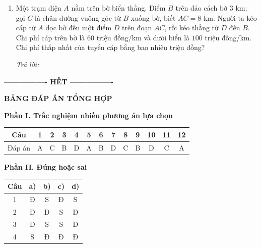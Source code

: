 \documentclass[12pt,a4paper]{article}
\newcommand{\otraloi}{\par\nobreak\smallskip\noindent\textit{Trả lời:}\quad\fbox{\rule{0pt}{11pt}\makebox[0.3cm]{}}\,\fbox{\rule{0pt}{11pt}\makebox[0.3cm]{}}\,\fbox{\rule{0pt}{11pt}\makebox[0.3cm]{}}\,\fbox{\rule{0pt}{11pt}\makebox[0.3cm]{}}}
\begin{document}
\begin{enumerate}[start=3]
\item Một trạm điện $A$ nằm trên bờ biển thẳng. Điểm $B$ trên đảo cách bờ $3$ km;
gọi $C$ là chân đường vuông góc từ $B$ xuống bờ, biết $AC=8$ km.
Người ta kéo cáp từ $A$ dọc bờ đến một điểm $D$ trên đoạn $AC$, rồi kéo thẳng từ $D$ đến $B$.
Chi phí cáp trên bờ là $60$ triệu đồng/km và dưới biển là $100$ triệu đồng/km.
Chi phí thấp nhất của tuyến cáp bằng bao nhiêu triệu đồng?
\begin{center}
\par{}
\end{center}
\otraloi
\end{enumerate}
\begin{center}\textbf{---------------- HẾT ----------------}\end{center}

\newpage\pagestyle{answers}
\begin{center}\Large\textbf{BẢNG ĐÁP ÁN TỔNG HỢP}\end{center}
\textbf{Phần I. Trắc nghiệm nhiều phương án lựa chọn}
\begin{center}
\renewcommand{\arraystretch}{1.5}
\begin{tabular}{|c|*{12}{c|}}\hline
Câu & 1&2&3&4&5&6&7&8&9&10&11&12\\\hline
Đáp án & A & C & B & D & A & B & D & C & B & D & C & A \\\hline
\end{tabular}
\end{center}

\textbf{Phần II. Đúng hoặc sai}
\begin{center}
\renewcommand{\arraystretch}{1.4}
\begin{tabular}{|c|c|c|c|c|}\hline
Câu & a) & b) & c) & d)\\\hline
1 & Đ & S & Đ & S\\\hline
2 & Đ & Đ & S & Đ\\\hline
3 & Đ & S & S & Đ\\\hline
4 & S & Đ & Đ & Đ\\\hline
\end{tabular}
\end{center}
\end{document}
